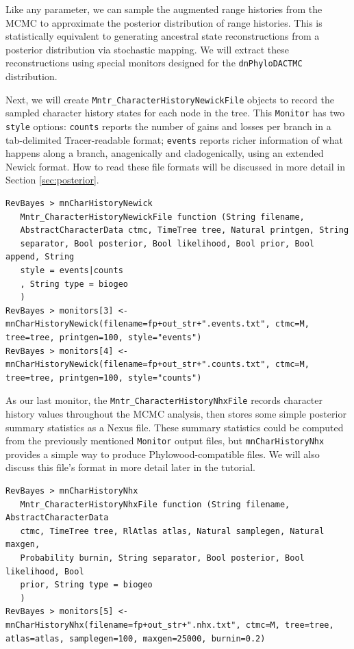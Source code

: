 Like any parameter, we can sample the augmented range histories from the MCMC to approximate the posterior distribution of range histories.
This is statistically equivalent to generating ancestral state reconstructions from a posterior distribution via stochastic mapping.
We will extract these reconstructions using special monitors designed for the {\tt dnPhyloDACTMC} distribution.

Next, we will create {\tt Mntr\_CharacterHistoryNewickFile} objects to record the sampled character history states for each node in the tree.
This {\tt Monitor} has two {\tt style} options: {\tt counts} reports the number of gains and losses per branch in a tab-delimited Tracer-readable format;  {\tt events} reports richer information of what happens along a branch, anagenically and cladogenically, using an extended Newick format.
How to read these file formats will be discussed in more detail in Section \ref{sec:posterior}.

\begin{snugshade}
\begin{lstlisting}
RevBayes > mnCharHistoryNewick
   Mntr_CharacterHistoryNewickFile function (String filename,
   AbstractCharacterData ctmc, TimeTree tree, Natural printgen, String
   separator, Bool posterior, Bool likelihood, Bool prior, Bool append, String
   style = events|counts
   , String type = biogeo
   )
RevBayes > monitors[3] <- mnCharHistoryNewick(filename=fp+out_str+".events.txt", ctmc=M, tree=tree, printgen=100, style="events")
RevBayes > monitors[4] <- mnCharHistoryNewick(filename=fp+out_str+".counts.txt", ctmc=M, tree=tree, printgen=100, style="counts")
\end{lstlisting}
\end{snugshade}

As our last monitor, the {\tt Mntr\_CharacterHistoryNhxFile} records character history values throughout the MCMC analysis, then stores some simple posterior summary statistics as a Nexus file.
These summary statistics could be computed from the previously mentioned {\tt Monitor} output files, but {\tt mnCharHistoryNhx} provides a simple way to produce Phylowood-compatible files.
We will also discuss this file's format in more detail later in the tutorial.

\begin{snugshade}
\begin{lstlisting}
RevBayes > mnCharHistoryNhx
   Mntr_CharacterHistoryNhxFile function (String filename, AbstractCharacterData
   ctmc, TimeTree tree, RlAtlas atlas, Natural samplegen, Natural maxgen,
   Probability burnin, String separator, Bool posterior, Bool likelihood, Bool
   prior, String type = biogeo
   )
RevBayes > monitors[5] <- mnCharHistoryNhx(filename=fp+out_str+".nhx.txt", ctmc=M, tree=tree, atlas=atlas, samplegen=100, maxgen=25000, burnin=0.2)
\end{lstlisting}
\end{snugshade}

